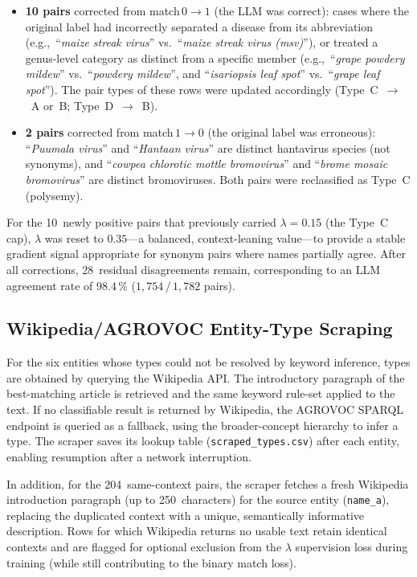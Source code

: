 \begin{itemize}
  \item \textbf{10 pairs} corrected from match\,$0 \to 1$
    (the LLM was correct):
    cases where the original label had incorrectly separated a disease
    from its abbreviation (e.g.,\ ``\emph{maize streak virus}''
    vs.\ ``\emph{maize streak virus (msv)}''), or treated a
    genus-level category as distinct from a specific member
    (e.g.,\ ``\emph{grape powdery mildew}'' vs.\ ``\emph{powdery
    mildew}'', and ``\emph{isariopsis leaf spot}'' vs.\ ``\emph{grape
    leaf spot}''). The pair types of these rows were updated accordingly
    (Type~C~$\to$~A or~B; Type~D~$\to$~B).

  \item \textbf{2 pairs} corrected from match\,$1 \to 0$
    (the original label was erroneous):
    ``\emph{Puumala virus}'' and ``\emph{Hantaan virus}'' are distinct
    hantavirus species (not synonyms), and
    ``\emph{cowpea chlorotic mottle bromovirus}'' and
    ``\emph{brome mosaic bromovirus}'' are distinct bromoviruses. Both
    pairs were reclassified as Type~C (polysemy).
\end{itemize}

For the 10~newly positive pairs that previously carried
$\lambda\!=\!0.15$ (the Type~C cap), $\lambda$ was reset to $0.35$---a
balanced, context-leaning value---to provide a stable gradient signal
appropriate for synonym pairs where names partially agree.
After all corrections, 28~residual disagreements remain, corresponding
to an LLM agreement rate of 98.4\,\%
($1{,}754\,/\,1{,}782$ pairs).

\subsection{Wikipedia/AGROVOC Entity-Type Scraping}
\label{sec:scraping}

For the six entities whose types could not be resolved by keyword
inference, types are obtained by querying the Wikipedia API.
The introductory paragraph of the best-matching article is retrieved
and the same keyword rule-set applied to the text.
If no classifiable result is returned by Wikipedia, the AGROVOC
SPARQL endpoint is queried as a fallback, using the broader-concept
hierarchy to infer a type.
The scraper saves its lookup table (\texttt{scraped\_types.csv}) after
each entity, enabling resumption after a network interruption.

In addition, for the 204~same-context pairs, the scraper fetches a
fresh Wikipedia introduction paragraph (up to 250~characters) for the
source entity (\texttt{name\_a}), replacing the duplicated context with
a unique, semantically informative description. Rows for which
Wikipedia returns no usable text retain identical contexts and are
flagged for optional exclusion from the $\lambda$ supervision loss
during training (while still contributing to the binary match loss).

